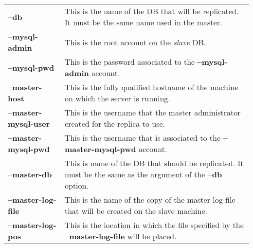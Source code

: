 \documentclass[a4paper]{book}
\begin{document}
\begin{longtable}{lp{3in}}
\textbf{--db}                  & This is the name of the DB that will
                                 be replicated.  It must be the same
                                 name used in the master.\\
\textbf{--mysql-admin}         & This is the root account on the
                                 \emph{slave} DB.\\
\textbf{--mysql-pwd}           & This is the password associated to
                                 the \textbf{--mysql-admin} account.\\
\textbf{--master-host}         & This is the fully qualified hostname
                                 of the machine on which the server is
                                 running.\\ 
\textbf{--master-mysql-user}   & This is the username that the master
                                 administrator created for the replica
                                 to use.\\
\textbf{--master-mysql-pwd}    & This is the username that is
                                 associated to the
                                 \textbf{--master-mysql-pwd}
                                 account.\\
\textbf{--master-db}           & This is name of the DB that should be
                                 replicated.  It must be the same as
                                 the argument of the \textbf{--db}
                                 option.\\
\textbf{--master-log-file}     & This is the name of the copy of the
                                 master log file that will be created
                                 on the slave machine.\\
\textbf{--master-log-pos}      & This is the location in which the
                                 file specified by the
                                 \textbf{--master-log-file} will be
                                 placed.\\
\end{longtable}
\end{document}
